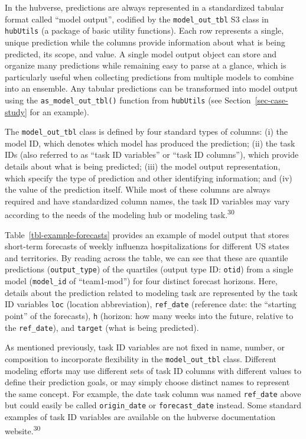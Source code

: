 \documentclass[
]{article}
\begin{document}
In the hubverse, predictions are always represented in a standardized
tabular format called ``model output'', codified by the
\texttt{model\_out\_tbl} S3 class in \texttt{hubUtils} (a package of
basic utility functions). Each row represents a single, unique
prediction while the columns provide information about what is being
predicted, its scope, and value. A single model output object can store
and organize many predictions while remaining easy to parse at a glance,
which is particularly useful when collecting predictions from multiple
models to combine into an ensemble. Any tabular predictions can be
transformed into model output using the \texttt{as\_model\_out\_tbl()}
function from \texttt{hubUtils} (see Section~\ref{sec-case-study} for an
example).

The \texttt{model\_out\_tbl} class is defined by four standard types of
columns: (i) the model ID, which denotes which model has produced the
prediction; (ii) the task IDs (also referred to as ``task ID variables''
or ``task ID columns''), which provide details about what is being
predicted; (iii) the model output representation, which specify the type
of prediction and other identifying information; and (iv) the value of
the prediction itself. While most of these columns are always required
and have standardized column names, the task ID variables may vary
according to the needs of the modeling hub or modeling
task.\textsuperscript{30}

Table~\ref{tbl-example-forecasts} provides an example of model output
that stores short-term forecasts of weekly influenza hospitalizations
for different US states and territories. By reading across the table, we
can see that these are quantile predictions (\texttt{output\_type}) of
the quartiles (output type ID: \texttt{otid}) from a single model
(\texttt{model\_id} of ``team1-mod'') for four distinct forecast
horizons. Here, details about the prediction related to modeling task
are represented by the task ID variables \texttt{loc} (location
abbreviation), \texttt{ref\_date} (reference date: the ``starting
point'' of the forecasts), \texttt{h} (horizon: how many weeks into the
future, relative to the \texttt{ref\_date}), and \texttt{target} (what
is being predicted).

As mentioned previously, task ID variables are not fixed in name,
number, or composition to incorporate flexibility in the
\texttt{model\_out\_tbl} class. Different modeling efforts may use
different sets of task ID columns with different values to define their
prediction goals, or may simply choose distinct names to represent the
same concept. For example, the date task column was named
\texttt{ref\_date} above but could easily be called
\texttt{origin\_date} or \texttt{forecast\_date} instead. Some standard
examples of task ID variables are available on the hubverse
documentation website.\textsuperscript{30}
\end{document}
